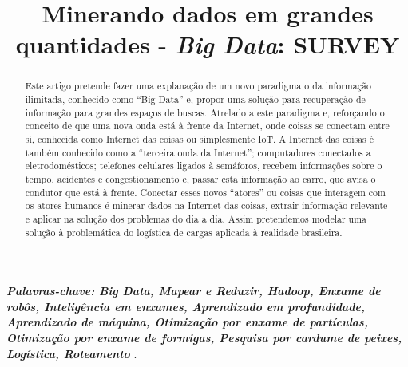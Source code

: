 \documentclass[conference,compsoc]{IEEEtran}
\begin{document}
%

\title{Minerando dados em grandes quantidades - \textit{Big Data}: SURVEY}


\author{
\and
{}
}



\maketitle

\begin{abstract}
Este artigo pretende fazer uma explanação de um novo paradigma o da informação ilimitada, conhecido como ``Big Data'' e, propor uma solução para recuperação de informação para grandes espaços de buscas. Atrelado a este paradigma e, reforçando o conceito de que uma nova onda está à frente da Internet, onde coisas se conectam entre si, conhecida como Internet das coisas ou simplesmente IoT. A Internet das coisas é também conhecido como a ``terceira onda da Internet''; computadores conectados a eletrodomésticos; telefones celulares ligados à semáforos, recebem informações sobre o tempo, acidentes e congestionamento e, passar esta informação ao carro, que avisa o condutor que está à frente. Conectar esses novos ``atores'' ou coisas que interagem com os atores humanos é minerar dados na Internet das coisas, extrair informação relevante e aplicar na solução dos problemas do dia a dia. Assim pretendemos modelar uma solução à problemática do logística de cargas aplicada à realidade brasileira.
\end{abstract}

\vspace{0.1cm}

\textit{\textbf{Palavras-chave: Big Data, Mapear e Reduzir, Hadoop, Enxame de robôs, Inteligência em enxames, Aprendizado em profundidade, Aprendizado de máquina, Otimização por enxame de partículas, Otimização por enxame de formigas, Pesquisa por cardume de peixes, Logística, Roteamento }
}.
\end{document}
